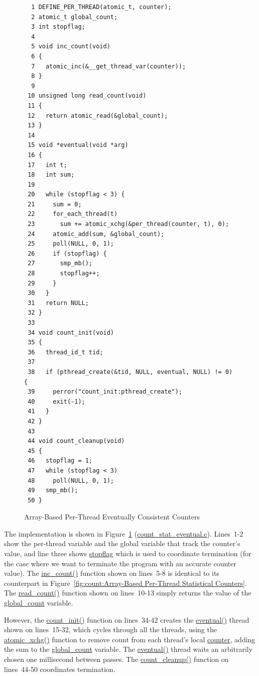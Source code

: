 \begin{figure}[tbp]
{ \scriptsize
\begin{verbatim}
  1 DEFINE_PER_THREAD(atomic_t, counter);
  2 atomic_t global_count;
  3 int stopflag;
  4 
  5 void inc_count(void)
  6 {
  7   atomic_inc(&__get_thread_var(counter));
  8 }
  9 
 10 unsigned long read_count(void)
 11 {
 12   return atomic_read(&global_count);
 13 }
 14 
 15 void *eventual(void *arg)
 16 {
 17   int t;
 18   int sum;
 19 
 20   while (stopflag < 3) {
 21     sum = 0;
 22     for_each_thread(t)
 23       sum += atomic_xchg(&per_thread(counter, t), 0);
 24     atomic_add(sum, &global_count);
 25     poll(NULL, 0, 1);
 26     if (stopflag) {
 27       smp_mb();
 28       stopflag++;
 29     }
 30   }
 31   return NULL;
 32 }
 33 
 34 void count_init(void)
 35 {
 36   thread_id_t tid;
 37 
 38   if (pthread_create(&tid, NULL, eventual, NULL) != 0) {
 39     perror("count_init:pthread_create");
 40     exit(-1);
 41   }
 42 }
 43 
 44 void count_cleanup(void)
 45 {
 46   stopflag = 1;
 47   while (stopflag < 3)
 48     poll(NULL, 0, 1);
 49   smp_mb();
 50 }
\end{verbatim}
}
\caption{Array-Based Per-Thread Eventually Consistent Counters}
\label{fig:count:Array-Based Per-Thread Eventually Consistent Counters}
\end{figure}

The implementation is shown in
Figure~\ref{fig:count:Array-Based Per-Thread Eventually Consistent Counters}
(\url{count_stat_eventual.c}).
Lines~1-2 show the per-thread variable and the global variable that
track the counter's value, and line three shows \url{stopflag}
which is used to coordinate termination (for the case where we want
to terminate the program with an accurate counter value).
The \url{inc_count()} function shown on lines~5-8 is identical to its
counterpart in
Figure~\ref{fig:count:Array-Based Per-Thread Statistical Counters}.
The \url{read_count()} function shown on lines~10-13 simply returns the
value of the \url{global_count} variable.

However, the \url{count_init()} function on lines~34-42
creates the \url{eventual()} thread shown on lines~15-32, which
cycles through all the threads, using the \url{atomic_xchg()} function
to remove count from each thread's local \url{counter}, adding the
sum to the \url{global_count} variable.
The \url{eventual()} thread waits an arbitrarily chosen one millisecond
between passes.
The \url{count_cleanup()} function on lines~44-50 coordinates termination.

